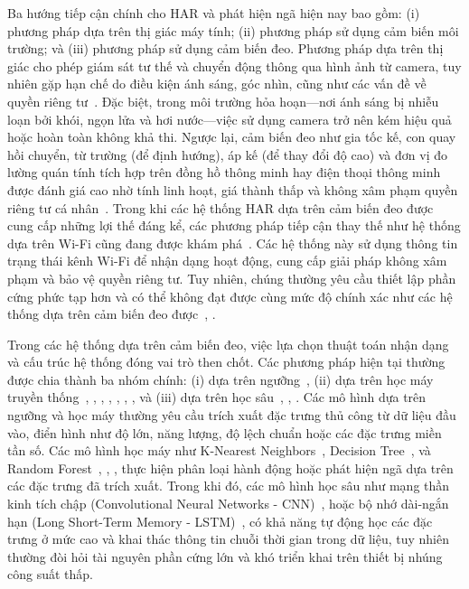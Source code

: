 Ba hướng tiếp cận chính cho HAR và phát hiện ngã hiện nay bao gồm: (i) phương pháp dựa trên thị giác máy tính; (ii) phương pháp sử dụng cảm biến môi trường; và (iii) phương pháp sử dụng cảm biến đeo. Phương pháp dựa trên thị giác cho phép giám sát tư thế và chuyển động thông qua hình ảnh từ camera, tuy nhiên gặp hạn chế do điều kiện ánh sáng, góc nhìn, cũng như các vấn đề về quyền riêng tư~\cite{vi2024efficient}. Đặc biệt, trong môi trường hỏa hoạn—nơi ánh sáng bị nhiễu loạn bởi khói, ngọn lửa và hơi nước—việc sử dụng camera trở nên kém hiệu quả hoặc hoàn toàn không khả thi. Ngược lại, cảm biến đeo như gia tốc kế, con quay hồi chuyển, từ trường (để định hướng), áp kế (để thay đổi độ cao) và đơn vị đo lường quán tính tích hợp trên đồng hồ thông minh hay điện thoại thông minh được đánh giá cao nhờ tính linh hoạt, giá thành thấp và không xâm phạm quyền riêng tư cá nhân~\cite{zhang2024effective}. Trong khi các hệ thống HAR dựa trên cảm biến đeo được cung cấp những lợi thế đáng kể, các phương pháp tiếp cận thay thế như hệ thống dựa trên Wi-Fi cũng đang được khám phá~\cite{lowe2022towards}. Các hệ thống này sử dụng thông tin trạng thái kênh Wi-Fi để nhận dạng hoạt động, cung cấp giải pháp không xâm phạm và bảo vệ quyền riêng tư. Tuy nhiên, chúng thường yêu cầu thiết lập phần cứng phức tạp hơn và có thể không đạt được cùng mức độ chính xác như các hệ thống dựa trên cảm biến đeo được~\cite{lowe2022towards}, \cite{ek2025comparing}.

Trong các hệ thống dựa trên cảm biến đeo, việc lựa chọn thuật toán nhận dạng và cấu trúc hệ thống đóng vai trò then chốt. Các phương pháp hiện tại thường được chia thành ba nhóm chính: (i) dựa trên ngưỡng~\cite{van2019development}, (ii) dựa trên học máy truyền thống~\cite{vi2024efficient}, \cite{bui2024smart}, \cite{hong2023low}, \cite{dao2022human}, \cite{thu2022real}, \cite{al2021towards}, \cite{chen2019detection},  và (iii) dựa trên học sâu~\cite{zhang2024effective}, \cite{yi2024fall}, \cite{soni2024cabmnet}. Các mô hình dựa trên ngưỡng và học máy thường yêu cầu trích xuất đặc trưng thủ công từ dữ liệu đầu vào, điển hình như độ lớn, năng lượng, độ lệch chuẩn hoặc các đặc trưng miền tần số. Các mô hình học máy như K-Nearest Neighbors~\cite{chen2019detection}, Decision Tree~\cite{bui2024smart}, \cite{thu2022real} và Random Forest~\cite{vi2024efficient}, \cite{al2021towards}, \cite{hong2023low}, \cite{dao2022human} thực hiện phân loại hành động hoặc phát hiện ngã dựa trên các đặc trưng đã trích xuất. Trong khi đó, các mô hình học sâu như mạng thần kinh tích chập (Convolutional Neural Networks - CNN)~\cite{zhang2024effective}, \cite{soni2024cabmnet} hoặc bộ nhớ dài-ngắn hạn (Long Short-Term Memory - LSTM)~\cite{yi2024fall}, \cite{soni2024cabmnet} có khả năng tự động học các đặc trưng ở mức cao và khai thác thông tin chuỗi thời gian trong dữ liệu, tuy nhiên thường đòi hỏi tài nguyên phần cứng lớn và khó triển khai trên thiết bị nhúng công suất thấp.

